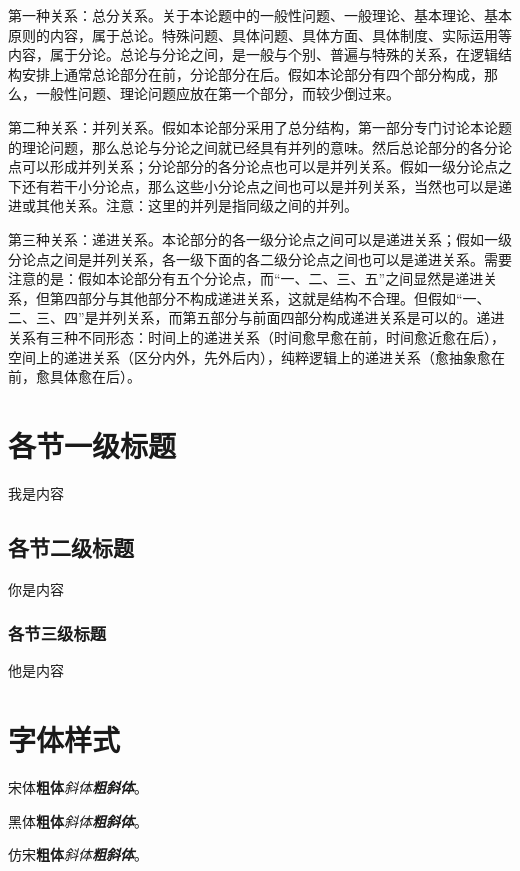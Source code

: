 第一种关系：总分关系。关于本论题中的一般性问题、一般理论、基本理论、基本原则的内容，属于总论。特殊问题、具体问题、具体方面、具体制度、实际运用等内容，属于分论。总论与分论之间，是一般与个别、普遍与特殊的关系，在逻辑结构安排上通常总论部分在前，分论部分在后。假如本论部分有四个部分构成，那么，一般性问题、理论问题应放在第一个部分，而较少倒过来。

第二种关系：并列关系。假如本论部分采用了总分结构，第一部分专门讨论本论题的理论问题，那么总论与分论之间就已经具有并列的意味。然后总论部分的各分论点可以形成并列关系；分论部分的各分论点也可以是并列关系。假如一级分论点之下还有若干小分论点，那么这些小分论点之间也可以是并列关系，当然也可以是递进或其他关系。注意：这里的并列是指同级之间的并列。

第三种关系：递进关系。本论部分的各一级分论点之间可以是递进关系；假如一级分论点之间是并列关系，各一级下面的各二级分论点之间也可以是递进关系。需要注意的是：假如本论部分有五个分论点，而“一、二、三、五”之间显然是递进关系，但第四部分与其他部分不构成递进关系，这就是结构不合理。但假如“一、二、三、四”是并列关系，而第五部分与前面四部分构成递进关系是可以的。递进关系有三种不同形态：时间上的递进关系（时间愈早愈在前，时间愈近愈在后），空间上的递进关系（区分内外，先外后内），纯粹逻辑上的递进关系（愈抽象愈在前，愈具体愈在后）。



\section{各节一级标题}
我是内容

\subsection{各节二级标题}
你是内容

\subsubsection{各节三级标题}
他是内容

\section{字体样式}
宋体\quad \textbf{粗体}\quad \textit{斜体}\quad \textbf{\textit{粗斜体}}。

{\heiti 黑体\quad \textbf{粗体}\quad \textit{斜体}\quad \textbf{\textit{粗斜体}}}。

{\fangsong 仿宋\quad \textbf{粗体}\quad \textit{斜体}\quad \textbf{\textit{粗斜体}}}。

